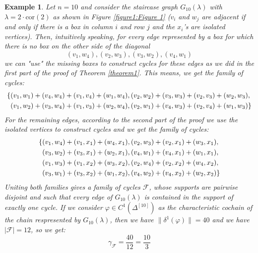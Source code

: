 \documentclass{article}
\newtheorem{expl}{Example}[section]
\begin{document}
\begin{expl}

Let \(n=10\) and consider the staircase graph \(G_{10}(\lambda)\) with \(\lambda=2\cdot\text{cor}(2)\) as shown in Figure \ref{figure1:Figure 1} (\(v_i\) and \(w_j\) are adjacent if and only if there is a box in column \(i\) and row \(j\) and the \(x_i\)'s are isolated vertices). Then, intuitively speaking, for every edge represented by a box for which there is no box on the other side of the diagonal
\[
(v_1,w_4),(v_2,w_3),(v_3,w_2),(v_4,w_1)
\]
we can "use" the missing boxes to construct cycles for these edges as we did in the first part of the proof of Theorem \ref{theorem1}. This means, we get the family of cycles:
\begin{align}
\{&(v_1,w_1)+(v_4,w_4)+(v_1,v_4)+(w_1,w_4),(v_2,w_2)+(v_3,w_3)+(v_2,v_3)+(w_2,w_3),\notag\\
&(v_1,w_2)+(v_3,w_4)+(v_1,v_3)+(w_2,w_4),(v_2,w_1)+(v_4,w_3)+(v_2,v_4)+(w_1,w_3)\}\notag
\end{align}
For the remaining edges, according to the second part of the proof we use the isolated vertices to construct cycles and we get the family of cycles:
\begin{align}
\{&(v_1,w_4)+(v_1,x_1)+(w_4,x_1),(v_2,w_3)+(v_2,x_1)+(w_3,x_1),\notag\\
&(v_3,w_2)+(v_3,x_1)+(w_2,x_1),(v_4,w_1)+(v_4,x_1)+(w_1,x_1),\notag\\
&(v_1,w_3)+(v_1,x_2)+(w_3,x_2),(v_2,w_4)+(v_2,x_2)+(w_4,x_2),\notag\\
&(v_3,w_1)+(v_3,x_2)+(w_1,x_2),(v_4,w_2)+(v_4,x_2)+(w_2,x_2)\}\notag
\end{align}
Uniting both families gives a family of cycles \(\mathcal{F}\), whose supports are pairwise disjoint and such that every edge of \(G_{10}(\lambda)\) is contained in the support of exactly one cycle. If we consider \(\varphi\in C^1(\Delta^{[10]})\) as the characteristic cochain of the chain respresented by \(G_{10}(\lambda)\), then we have \(\|\delta^1(\varphi)\|=40\) and we have \(|\mathcal{F}|=12\), so we get:
\[
\gamma_{\mathcal{F}}=\frac{40}{12}=\frac{10}{3}
\]

\begin{figure}[ht]
\centering
{}
\end{figure}
\end{expl}
\end{document}
